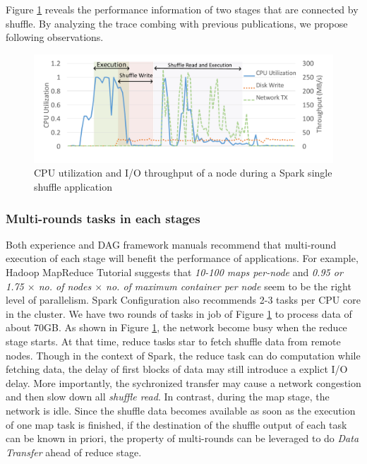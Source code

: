 Figure \ref{fig:util} reveals the performance information of two stages that are connected by shuffle. By analyzing the trace combing with previous publications, we propose following observations. 

\begin{figure}
	\includegraphics[width=\linewidth]{fig/util}
	\caption{CPU utilization and I/O throughput of a node during a Spark single shuffle application}
	\label{fig:util}
\end{figure}

\subsubsection{Multi-rounds tasks in each stages}\label{multi}
Both experience and DAG framework manuals recommend that multi-round execution of each stage will benefit the performance of applications.
For example, Hadoop MapReduce Tutorial \cite{hadooptutorial} suggests that \textit{10-100 maps per-node} and \textit{0.95 or 1.75 $\times$ no. of nodes $\times$ no. of maximum container per node} seem to be the right level of parallelism. Spark Configuration also recommends 2-3 tasks per CPU core in the cluster\cite{sparkconf}.
We have two rounds of tasks in job of Figure \ref{fig:util} to process data of about $70$GB. As shown in Figure \ref{fig:util}, the network become busy when the reduce stage starts. At that time, reduce tasks star to fetch shuffle data from remote nodes.
Though in the context of Spark, the reduce task can do computation while fetching data, the delay of first blocks of data may still introduce a explict I/O delay. More importantly, the sychronized transfer may cause a network congestion and then slow down all \textit{shuffle read}. In contrast, during the map stage, the network is idle. Since the shuffle data becomes available as soon as the execution of one map task is finished, if the destination of the shuffle output of each task can be known in priori, the property of multi-rounds can be leveraged to do \textit{Data Transfer} ahead of reduce stage.

